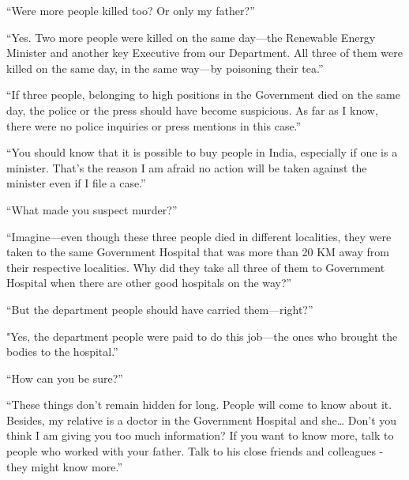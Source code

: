 “Were more people killed too? Or only my father?”

“Yes. Two more people were killed on the same day—the Renewable Energy
Minister and another key Executive from our Department. All three of them were
killed on the same day, in the same way—by poisoning their tea.”

“If three people, belonging to high positions in the Government died on the same
day, the police or the press should have become suspicious. As far as I know,
there were no police inquiries or press mentions in this case.”

“You should know that it is possible to buy people in India, especially if one
is a minister. That's the reason I am afraid no action will be taken against the
minister even if I file a case.”

“What made you suspect murder?”

“Imagine—even though these three people died in different localities, they
were taken to the same Government Hospital that was more than 20 KM away from
their respective localities. Why did they take all three of them to Government
Hospital when there are other good hospitals on the way?”

“But the department people should have carried them—right?”

"Yes, the department people were paid to do this job—the ones who brought the
bodies to the hospital.”

“How can you be sure?”

“These things don't remain hidden for long. People will come to know about it.
Besides, my relative is a doctor in the Government Hospital and she… Don't
you think I am giving you too much information? If you want to know more, talk
to people who worked with your father. Talk to his close friends and colleagues
- they might know more.”